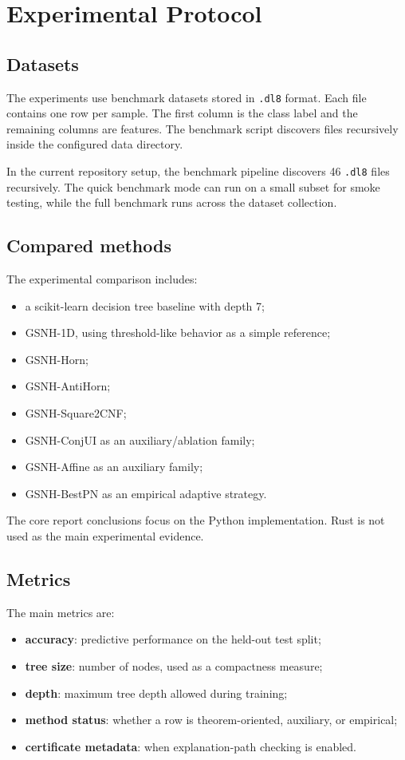 \documentclass[11pt,a4paper]{article}
\begin{document}
\section{Experimental Protocol}

\subsection{Datasets}

The experiments use benchmark datasets stored in \texttt{.dl8} format. Each file contains one row per sample. The first column is the class label and the remaining columns are features. The benchmark script discovers files recursively inside the configured data directory.

In the current repository setup, the benchmark pipeline discovers 46 \texttt{.dl8} files recursively. The quick benchmark mode can run on a small subset for smoke testing, while the full benchmark runs across the dataset collection.

\subsection{Compared methods}

The experimental comparison includes:
\begin{itemize}
    \item a scikit-learn decision tree baseline with depth 7;
    \item GSNH-1D, using threshold-like behavior as a simple reference;
    \item GSNH-Horn;
    \item GSNH-AntiHorn;
    \item GSNH-Square2CNF;
    \item GSNH-ConjUI as an auxiliary/ablation family;
    \item GSNH-Affine as an auxiliary family;
    \item GSNH-BestPN as an empirical adaptive strategy.
\end{itemize}

The core report conclusions focus on the Python implementation. Rust is not used as the main experimental evidence.

\subsection{Metrics}

The main metrics are:
\begin{itemize}
    \item \textbf{accuracy}: predictive performance on the held-out test split;
    \item \textbf{tree size}: number of nodes, used as a compactness measure;
    \item \textbf{depth}: maximum tree depth allowed during training;
    \item \textbf{method status}: whether a row is theorem-oriented, auxiliary, or empirical;
    \item \textbf{certificate metadata}: when explanation-path checking is enabled.
\end{itemize}
\end{document}
